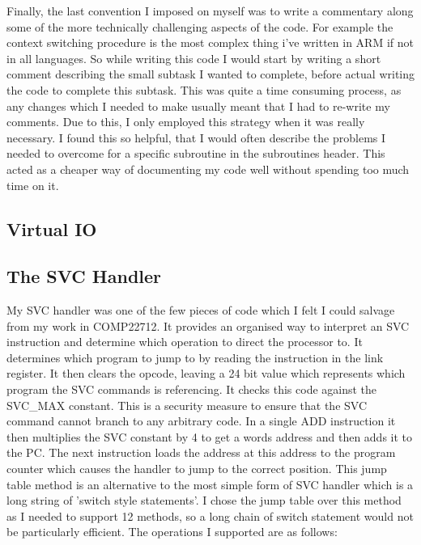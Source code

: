 Finally, the last convention I imposed on myself was to write a commentary along some of the more technically challenging aspects of the code. For example the context switching procedure is the most complex thing i've written in ARM if not in all languages. So while writing this code I would start by writing a short comment describing the small subtask I wanted to complete, before actual writing the code to complete this subtask. This was quite a time consuming process, as any changes which I needed to make usually meant that I had to re-write my comments. Due to this, I only employed this strategy when it was really necessary. I found this so helpful, that I would often describe the problems I needed to overcome for a specific subroutine in the subroutines header. This acted as a cheaper way of documenting my code well without spending too much time on it. 
\subsection{Virtual IO}
\subsection{The SVC Handler}
My SVC handler was one of the few pieces of code which I felt I could salvage from my work in COMP22712. It provides an organised way to interpret an SVC instruction and determine which operation to direct the processor to. It determines which program to jump to by reading the instruction in the link register. It then clears the opcode, leaving a 24 bit value which represents which program the SVC commands is referencing. It checks this code against the SVC\_MAX constant. This is a security measure to ensure that the SVC command cannot branch to any arbitrary code. In a single ADD instruction it then multiplies the SVC constant by 4 to get a words address and then adds it to the PC. The next instruction loads the address at this address to the program counter which causes the handler to jump to the correct position. This jump table method is an alternative to the most simple form of SVC handler which is a long string of 'switch style statements'. I chose the jump table over this method as I needed to support 12 methods, so a long chain of switch statement would not be particularly efficient. The operations I supported are as follows:

